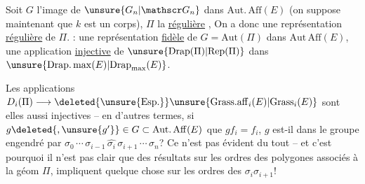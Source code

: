Soit $G$ l'image de $\unsure{G_n|\mathscr G_n}$ dans $\mathrm{Aut.\,Aff}(E)$ (on suppose maintenant que $k$ est un corps), $\Pi$ la  \uline{régulière}  , On a donc une représentation \uline{régulière} de $\Pi$. : une représentation \uline{fidèle} de $G=\mathrm{Aut}(\Pi)$ dans $\mathrm{Aut\,Aff}(E)$,  une application \uline{injective} de $\unsure{\mathrm{Drap}(\Pi)|\mathrm{Rep}(\Pi)}$ dans $\unsure{\mathrm{Drap.\,max}(E)|\mathrm{Drap}_{\max}(E)}$.

Les applications $D_i(\Pi)\longrightarrow\deleted{\unsure{\mathrm{Esp.}}}\unsure{\mathrm{Grass.aff}_i(E)|\mathrm{Grass}_i(E)}$ sont elles aussi injectives -- en d'autres termes, si  $g\deleted{,\unsure{g'}}\in G\subset\mathrm{Aut.\,Aff}(E)$
 que 
$gf_i=f_i$, $g$ est-il dans le groupe engendré par $\sigma_0\,\cdots\,\sigma_{i-1}\,\widehat{\sigma_i}\,\sigma_{i+1}\,\cdots\,\sigma_n$? Ce n'est pas évident du tout -- et c'est pourquoi il n'est pas clair que des résultats sur les  ordres des polygones associés à la  géom  $\Pi$, impliquent quelque chose sur les ordres des $\sigma_i\sigma_{i+1}$!
